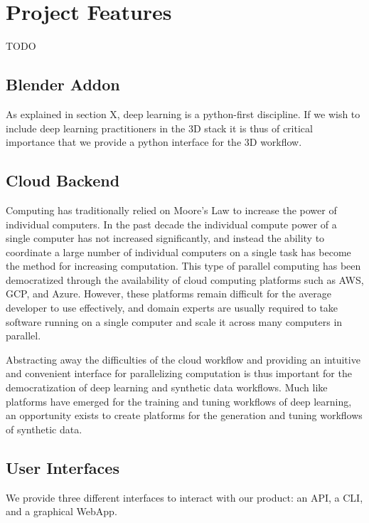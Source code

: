 \documentclass{article}
\begin{document}
\section{Project Features}
\label{sec:projectfeatures}

TODO

\subsection{Blender Addon}
\label{sec:blenderaddon}

As explained in section X, deep learning is a python-first discipline. If we wish to include deep learning practitioners in the 3D stack it is thus of critical importance that we provide a python interface for the 3D workflow.

\subsection{Cloud Backend}
\label{sec:cloudbackend}

Computing has traditionally relied on Moore’s Law to increase the power of individual computers. In the past decade the individual compute power of a single computer has not increased significantly, and instead the ability to coordinate a large number of individual computers on a single task has become the method for increasing computation. This type of parallel computing has been democratized through the availability of cloud computing platforms such as AWS, GCP, and Azure. However, these platforms remain difficult for the average developer to use effectively, and domain experts are usually required to take software running on a single computer and scale it across many computers in parallel.

Abstracting away the difficulties of the cloud workflow and providing an intuitive and convenient interface for parallelizing computation is thus important for the democratization of deep learning and synthetic data workflows. Much like platforms have emerged for the training and tuning workflows of deep learning, an opportunity exists to create platforms for the generation and tuning workflows of synthetic data.


\subsection{User Interfaces}
\label{sec:cloudbackend}

We provide three different interfaces to interact with our product: an API, a CLI, and a graphical WebApp.
\end{document}
